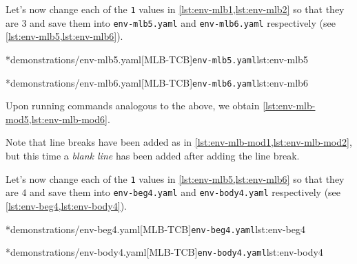 	Let's%
	 now change each of
	the \texttt{1} values in \cref{lst:env-mlb1,lst:env-mlb2} so that they are
	$3$ and save them into \texttt{env-mlb5.yaml} and
	\texttt{env-mlb6.yaml} respectively (see \cref{lst:env-mlb5,lst:env-mlb6}).

	\begin{minipage}{.45\textwidth}
		\cmhlistingsfromfile[style=yaml-LST]*{demonstrations/env-mlb5.yaml}[MLB-TCB]{\texttt{env-mlb5.yaml}}{lst:env-mlb5}
	\end{minipage}
	\hfill
	\begin{minipage}{.45\textwidth}
		\cmhlistingsfromfile[style=yaml-LST]*{demonstrations/env-mlb6.yaml}[MLB-TCB]{\texttt{env-mlb6.yaml}}{lst:env-mlb6}
	\end{minipage}

	Upon running commands analogous to the above, we obtain \cref{lst:env-mlb-mod5,lst:env-mlb-mod6}.

	\begin{widepage}
		\begin{minipage}{.56\linewidth}
		\end{minipage}
		\hfill
		\begin{minipage}{.43\linewidth}
		\end{minipage}
	\end{widepage}

	Note that line breaks have been added as in \cref{lst:env-mlb-mod1,lst:env-mlb-mod2}, but this time a
	\emph{blank line} has been added after adding the line break.

	Let's now change%
	 each of
	the \texttt{1} values in \cref{lst:env-mlb5,lst:env-mlb6} so that they are
	$4$ and save them into \texttt{env-beg4.yaml} and
	\texttt{env-body4.yaml} respectively (see \cref{lst:env-beg4,lst:env-body4}).

	\begin{minipage}{.45\textwidth}
		\cmhlistingsfromfile*[style=yaml-LST]*{demonstrations/env-beg4.yaml}[MLB-TCB]{\texttt{env-beg4.yaml}}{lst:env-beg4}
	\end{minipage}
	\hfill
	\begin{minipage}{.45\textwidth}
		\cmhlistingsfromfile*[style=yaml-LST]*{demonstrations/env-body4.yaml}[MLB-TCB]{\texttt{env-body4.yaml}}{lst:env-body4}
	\end{minipage}

